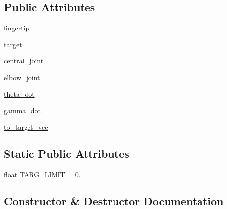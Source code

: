 \subsection*{Public Attributes}
\begin{DoxyCompactItemize}
\item 
\hyperlink{classpybullet-gym_1_1pybulletgym_1_1envs_1_1roboschool_1_1robots_1_1manipulators_1_1reacher_1_1_reacher_a6105f565b5440d85f411c507ca69bfec}{fingertip}
\item 
\hyperlink{classpybullet-gym_1_1pybulletgym_1_1envs_1_1roboschool_1_1robots_1_1manipulators_1_1reacher_1_1_reacher_a471d3970a10d80e0622009b147189dc6}{target}
\item 
\hyperlink{classpybullet-gym_1_1pybulletgym_1_1envs_1_1roboschool_1_1robots_1_1manipulators_1_1reacher_1_1_reacher_afd668a17e16e19e26dfb85b3005b723a}{central\+\_\+joint}
\item 
\hyperlink{classpybullet-gym_1_1pybulletgym_1_1envs_1_1roboschool_1_1robots_1_1manipulators_1_1reacher_1_1_reacher_af507cbff850711b846c2a20d5da3643d}{elbow\+\_\+joint}
\item 
\hyperlink{classpybullet-gym_1_1pybulletgym_1_1envs_1_1roboschool_1_1robots_1_1manipulators_1_1reacher_1_1_reacher_a3a792a2edf20c6d7dbe87f8f87031a89}{theta\+\_\+dot}
\item 
\hyperlink{classpybullet-gym_1_1pybulletgym_1_1envs_1_1roboschool_1_1robots_1_1manipulators_1_1reacher_1_1_reacher_aa28dd0c400f63393302ca35d35dae263}{gamma\+\_\+dot}
\item 
\hyperlink{classpybullet-gym_1_1pybulletgym_1_1envs_1_1roboschool_1_1robots_1_1manipulators_1_1reacher_1_1_reacher_a4635484cc1275b080d4559623f651604}{to\+\_\+target\+\_\+vec}
\end{DoxyCompactItemize}
\subsection*{Static Public Attributes}
\begin{DoxyCompactItemize}
\item 
float \hyperlink{classpybullet-gym_1_1pybulletgym_1_1envs_1_1roboschool_1_1robots_1_1manipulators_1_1reacher_1_1_reacher_ab04e8978e01ae6e6309c75594df5b75c}{T\+A\+R\+G\+\_\+\+L\+I\+M\+IT} = 0.
\end{DoxyCompactItemize}


\subsection{Constructor \& Destructor Documentation}
